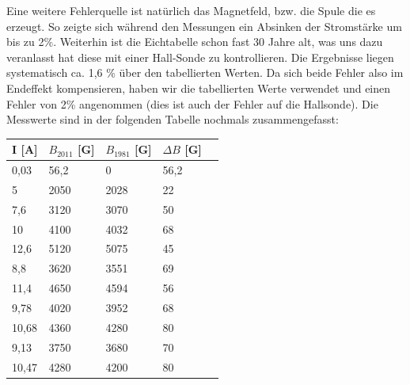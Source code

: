 Eine weitere Fehlerquelle ist natürlich das Magnetfeld, bzw. die Spule die es erzeugt. So zeigte sich während den Messungen ein Absinken der Stromstärke um bis zu 2\%. Weiterhin ist die Eichtabelle schon fast 30 Jahre alt, was uns dazu veranlasst hat diese mit einer Hall-Sonde zu kontrollieren. Die Ergebnisse liegen systematisch ca. 1,6 \% über den tabellierten Werten. Da sich beide Fehler also im Endeffekt kompensieren, haben wir die tabellierten Werte verwendet und einen Fehler von 2\% angenommen (dies ist auch der Fehler auf die Hallsonde). Die Messwerte sind in der folgenden Tabelle nochmals zusammengefasst: 

\begin{center}
\begin{tabular}{lllll}
\toprule
I [A] & $B_{2011}$ [G] & $B_{1981}$ [G] & $\Delta B$ [G] \\
\midrule
0,03&	56,2&	0&	56,2\\
5&	2050&	2028&	22\\
7,6&	3120&	3070&	50\\
10&	4100&	4032&	68\\
12,6&	5120&	5075&	45\\
8,8&	3620&	3551&	69\\
11,4&	4650&	4594&	56\\
9,78&	4020&	3952&	68\\
10,68&	4360&	4280&	80\\
9,13&	3750&	3680&	70\\
10,47&	4280&	4200&	80\\
\bottomrule
\end{tabular}
\end{center}